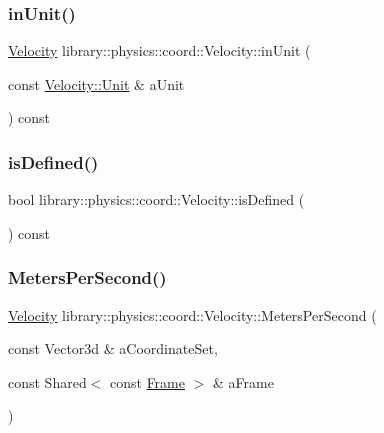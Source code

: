 \subsubsection{\texorpdfstring{in\+Unit()}{inUnit()}}
{\footnotesize\ttfamily \hyperlink{classlibrary_1_1physics_1_1coord_1_1_velocity}{Velocity} library\+::physics\+::coord\+::\+Velocity\+::in\+Unit (\begin{DoxyParamCaption}\item[{const \hyperlink{classlibrary_1_1physics_1_1coord_1_1_velocity_a8bbc811932c454dbe0ab8b56f1b2c0b3}{Velocity\+::\+Unit} \&}]{a\+Unit }\end{DoxyParamCaption}) const}

\mbox{\label{classlibrary_1_1physics_1_1coord_1_1_velocity_a5487f6d50e13d2262bf0726ed8536c99}} 
\subsubsection{\texorpdfstring{is\+Defined()}{isDefined()}}
{\footnotesize\ttfamily bool library\+::physics\+::coord\+::\+Velocity\+::is\+Defined (\begin{DoxyParamCaption}{ }\end{DoxyParamCaption}) const}

\mbox{\label{classlibrary_1_1physics_1_1coord_1_1_velocity_ae00ee3d929b00160789cf33dcb448ae3}} 
\subsubsection{\texorpdfstring{Meters\+Per\+Second()}{MetersPerSecond()}}
{\footnotesize\ttfamily \hyperlink{classlibrary_1_1physics_1_1coord_1_1_velocity}{Velocity} library\+::physics\+::coord\+::\+Velocity\+::\+Meters\+Per\+Second (\begin{DoxyParamCaption}\item[{const Vector3d \&}]{a\+Coordinate\+Set,  }\item[{const Shared$<$ const \hyperlink{classlibrary_1_1physics_1_1coord_1_1_frame}{Frame} $>$ \&}]{a\+Frame }\end{DoxyParamCaption})\hspace{0.3cm}{\ttfamily [static]}}

